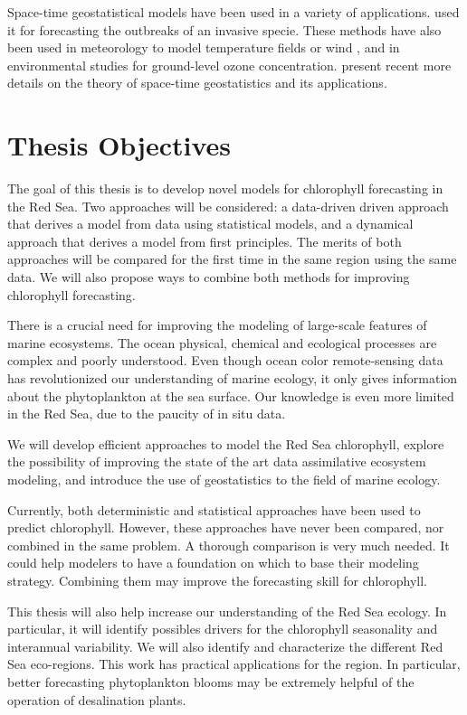 Space-time geostatistical models have been used in a variety of applications.
\citet{Hohn1993} used it for forecasting the outbreaks of an invasive specie.
These methods have also been used in meteorology to model temperature fields
\citep{Handcock1994, North2011} or wind \citep{Cressie1999, Gneiting2002}, and
in environmental studies for ground-level ozone concentration.
\citet{Gneiting2007, Gneiting2010} present recent more details on the theory of
space-time geostatistics and its applications.

\section{Thesis Objectives}

The goal of this thesis is to develop novel models for chlorophyll forecasting
in the Red Sea. Two approaches will be considered: a data-driven driven
approach that derives a model from data using statistical models, and a
dynamical approach that derives a model from first principles. The merits of
both approaches will be compared for the first time in the same region using
the same data. We will also propose ways to combine both methods for improving
chlorophyll forecasting.

There is a crucial need for improving the modeling of large-scale features of
marine ecosystems. The ocean physical, chemical and ecological processes are
complex and poorly understood. Even though ocean color remote-sensing data has
revolutionized our understanding of marine ecology, it only gives information
about the phytoplankton at the sea surface. Our knowledge is even more limited
in the Red Sea, due to the paucity of in situ data.

We will develop efficient approaches to model the Red Sea chlorophyll, explore
the possibility of improving the state of the art data assimilative ecosystem
modeling, and introduce the use of geostatistics to the field of marine
ecology.

Currently, both deterministic and statistical approaches have been used to
predict chlorophyll. However, these approaches have never been compared, nor
combined in the same problem. A thorough comparison is very much needed. It
could help modelers to have a foundation on which to base their modeling
strategy. Combining them may improve the forecasting skill for chlorophyll.

This thesis will also help increase our understanding of the Red Sea ecology.
In particular, it will identify possibles drivers for the chlorophyll
seasonality and interannual variability. We will also identify and characterize
the different Red Sea eco-regions. This work has practical applications for the
region. In particular, better forecasting phytoplankton blooms may be extremely
helpful of the operation of desalination plants.
